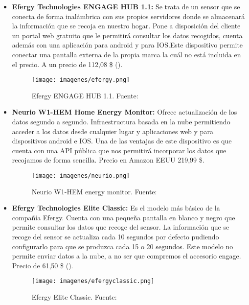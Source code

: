 \begin{itemize}
\item\textbf{Efergy Technologies ENGAGE HUB 1.1: } Se trata de un sensor que se conecta de forma inalámbrica con sus propios servidores donde se almacenará la información que se recoja en nuestro hogar. Pone a disposición del cliente un portal web gratuito que le permitirá consultar los datos recogidos, cuenta además con una aplicación para android y para IOS.Este dispositivo permite conectar una pantalla externa de la propia marca la cuál no está incluida en el precio. A un precio de 112,08 \$ ().\cite{Efergy}
	
\begin{figure}[H]
	\centering
	\texttt{[image: imagenes/efergy.png]}
	\caption[Efergy ENGAGE HUB 1.1]{Efergy ENGAGE HUB 1.1. Fuente: \cite{Efergy}}
	\label{fig:Efergy}
\end{figure}


\item\textbf{Neurio W1-HEM Home Energy Monitor: } Ofrece actualización de los datos segundo a segundo. Infraestructura basada en la nube permitiendo acceder a los datos desde cualquier lugar y aplicaciones web y para dispositivos android e IOS. Una de las ventajas de este dispositivo es que cuenta con una API pública que nos permitirá incorporar los datos que recojamos de forma sencilla. Precio en Amazon EEUU 219,99 \$. \cite{Neur}
	
	
\begin{figure}[H]
	\centering
	\texttt{[image: imagenes/neurio.png]}
	\caption[Neurio W1-HEM energy monitor]{Neurio W1-HEM energy monitor. Fuente: \cite{Neur}}
	\label{fig:neurio}
\end{figure}

\item\textbf{Efergy Technologies Elite Classic: } Es el modelo más básico de la compañía Efergy. Cuenta con una pequeña pantalla en blanco y negro que permite consultar los datos que recoge del sensor. La información que se recoge del sensor se actualiza cada 10 segundos por defecto pudiendo configurarlo para que se produzca cada 15 o 20 segundos. Este modelo no permite enviar datos a la nube, a no ser que compremos el accesorio engage. Precio de 61,50 \$ ().\cite{Efergyclassic}

\begin{figure}[H]
	\centering
	\texttt{[image: imagenes/efergyclassic.png]}
	\caption[Efergy Elite Classic.]{Efergy Elite Classic. Fuente: \cite{Efergyclassic}}
	\label{fig:Efergyclassic}
\end{figure}


\end{itemize}
